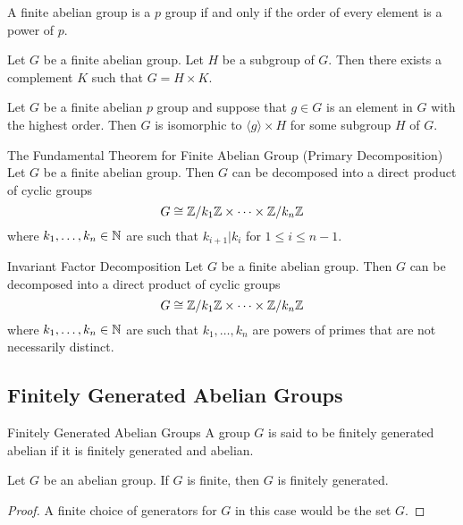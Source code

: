 \documentclass[a4paper]{article}
\begin{document}
\begin{lmm}{}{} A finite abelian group is a $p$ group if and only if the order of every element is a power of $p$. 
\end{lmm}

\begin{lmm}{}{} Let $G$ be a finite abelian group. Let $H$ be a subgroup of $G$. Then there exists a complement $K$ such that $G=H\times K$. 
\end{lmm}

\begin{lmm}{}{} Let $G$ be a finite abelian $p$ group and suppose that $g\in G$ is an element in $G$ with the highest order. Then $G$ is isomorphic to $\langle g\rangle\times H$ for some subgroup $H$ of $G$. 
\end{lmm}

\begin{thm}{The Fundamental Theorem for Finite Abelian Group (Primary Decomposition)}{} Let $G$ be a finite abelian group. Then $G$ can be decomposed into a direct product of cyclic groups $$G\cong\mathbb{Z}/k_1\mathbb{Z}\times\dots\times\mathbb{Z}/k_n\mathbb{Z}$$ where $k_1,\dots,k_n\in\mathbb{N}$ are such that $k_{i+1}|k_i$ for $1\leq i\leq n-1$. 
\end{thm}

\begin{thm}{Invariant Factor Decomposition}{} Let $G$ be a finite abelian group. Then $G$ can be decomposed into a direct product of cyclic groups $$G\cong\mathbb{Z}/k_1\mathbb{Z}\times\dots\times\mathbb{Z}/k_n\mathbb{Z}$$ where $k_1,\dots,k_n\in\mathbb{N}$ are such that $k_1,\dots,k_n$ are powers of primes that are not necessarily distinct. 
\end{thm}

\subsection{Finitely Generated Abelian Groups}
\begin{defn}{Finitely Generated Abelian Groups}{} A group $G$ is said to be finitely generated abelian if it is finitely generated and abelian. 
\end{defn}

\begin{lmm}{}{} Let $G$ be an abelian group. If $G$ is finite, then $G$ is finitely generated. \tcbline
\begin{proof}
A finite choice of generators for $G$ in this case would be the set $G$. 
\end{proof}
\end{lmm}
\end{document}
